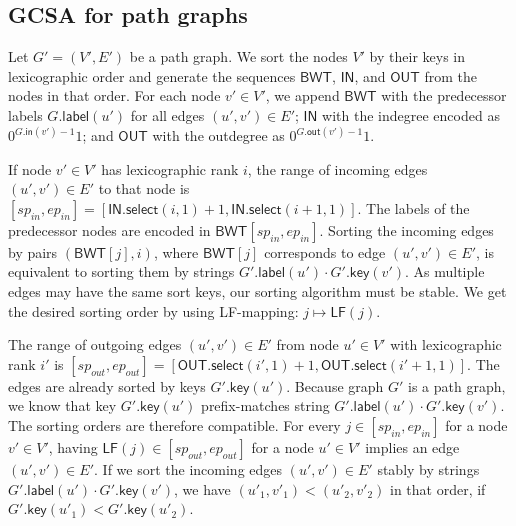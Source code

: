 \documentclass[a4paper,UKenglish]{lipics-v2016}
\newcommand{\select}{\ensuremath{\mathsf{select}}}
\newcommand{\LF}{\ensuremath{\mathsf{LF}}}
\newcommand{\gindegree}{\ensuremath{\mathsf{in}}}
\newcommand{\goutdegree}{\ensuremath{\mathsf{out}}}
\newcommand{\glabel}{\ensuremath{\mathsf{label}}}
\newcommand{\gkey}{\ensuremath{\mathsf{key}}}
\newcommand{\LFmapping}{LF\nobreakdash-mapping}
\newcommand{\BWT}{\ensuremath{\mathsf{BWT}}}
\newcommand{\bvIN}{\ensuremath{\mathsf{IN}}}
\newcommand{\bvOUT}{\ensuremath{\mathsf{OUT}}}
\begin{document}
\subsection{GCSA for path graphs}

Let $G' = (V', E')$ be a path graph. We sort the nodes $V'$ by their keys in lexicographic order and generate the sequences $\BWT$, $\bvIN$, and $\bvOUT$ from the nodes in that order. For each node $v' \in V'$, we append $\BWT$ with the predecessor labels $G.\glabel(u')$ for all edges $(u', v') \in E'$; $\bvIN$ with the indegree encoded as $0^{G.\gindegree(v')-1} 1$; and $\bvOUT$ with the outdegree as $0^{G.\goutdegree(v')-1} 1$.

If node $v' \in V'$ has lexicographic rank $i$, the range of incoming edges $(u', v') \in E'$ to that node is $[sp_{in}, ep_{in}] = [\bvIN.\select(i, 1) + 1, \bvIN.\select(i+1, 1)]$. The labels of the predecessor nodes are encoded in $\BWT[sp_{in}, ep_{in}]$. Sorting the incoming edges by pairs $(\BWT[j], i)$, where $\BWT[j]$ corresponds to edge $(u', v') \in E'$, is equivalent to sorting them by strings $G'.\glabel(u') \cdot G'.\gkey(v')$. As multiple edges may have the same sort keys, our sorting algorithm must be stable. We get the desired sorting order by using \LFmapping: $j \mapsto \LF(j)$.

The range of outgoing edges $(u', v') \in E'$ from node $u' \in V'$ with lexicographic rank $i'$ is $[sp_{out}, ep_{out}] = [\bvOUT.\select(i', 1) + 1, \bvOUT.\select(i'+1, 1)]$. The edges are already sorted by keys $G'.\gkey(u')$. Because graph $G'$ is a path graph, we know that key $G'.\gkey(u')$ prefix-matches string $G'.\glabel(u') \cdot G'.\gkey(v')$. The sorting orders are therefore compatible. For every $j \in [sp_{in}, ep_{in}]$ for a node $v' \in V'$, having $\LF(j) \in [sp_{out}, ep_{out}]$ for a node $u' \in V'$ implies an edge $(u', v') \in E'$. If we sort the incoming edges $(u', v') \in E'$ stably by strings $G'.\glabel(u') \cdot G'.\gkey(v')$, we have $(u'_{1}, v'_{1}) < (u'_{2}, v'_{2})$ in that order, if $G'.\gkey(u'_{1}) < G'.\gkey(u'_{2})$.
\end{document}
